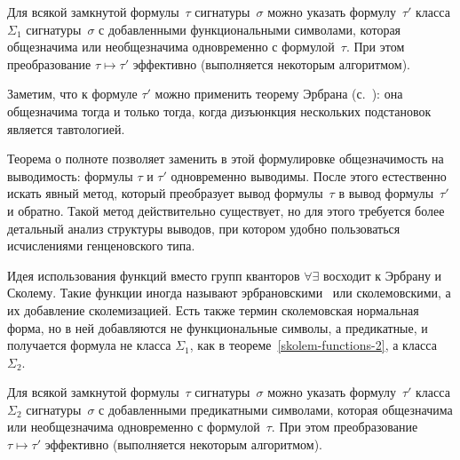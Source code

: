 \begin{theorem}
        \label{skolem-functions-2}
Для всякой замкнутой формулы~$\tau$ сигнатуры~$\sigma$ можно
указать формулу~$\tau'$ класса $\Sigma_1$ сигнатуры~$\sigma$ с
добавленными функциональными символами, которая общезначима или
необщезначима одновременно с формулой~$\tau$. При этом
преобразование $\tau\mapsto\tau'$ эффективно (выполняется
некоторым алгоритмом).
\end{theorem}

Заметим, что к формуле $\tau'$ можно применить теорему Эрбрана
(с.~\pageref{herbrand-theorem}): она общезначима тогда и только тогда,
когда дизъюнкция нескольких подстановок является тавтологией.

Теорема о полноте позволяет заменить в этой формулировке
общезначимость на выводимость: формулы $\tau$ и $\tau'$
одновременно выводимы. После этого естественно искать явный
метод, который преобразует вывод формулы~$\tau$ в вывод
формулы~$\tau'$ и обратно. Такой метод действительно существует,
но для этого требуется более детальный анализ структуры
выводов, при котором удобно пользоваться исчислениями
генценовского типа.

Идея использования функций вместо групп кванторов
$\forall\exists$ восходит к Эрбрану%
и Сколему.%
Такие функции
иногда называют  эрбрановскими%
%
%
\ или  сколемовскими,%
%
а их добавление \т  сколемизацией.%
Есть также термин 
сколемовская нормальная форма,%
%
но в ней добавляются не
функциональные символы, а предикатные, и получается формула не
класса $\Sigma_1$, как в теореме~\ref{skolem-functions-2}, а
класса~$\Sigma_2$.

\begin{theorem}
%
        \label{skolem-normal-form}%
Для всякой замкнутой формулы~$\tau$ сигнатуры~$\sigma$ можно
указать формулу~$\tau'$ класса $\Sigma_2$ сигнатуры~$\sigma$ с
добавленными предикатными символами, которая общезначима или
необщезначима одновременно с формулой~$\tau$. При этом
преобразование $\tau\mapsto\tau'$ эффективно (выполняется
некоторым алгоритмом).
\end{theorem}

